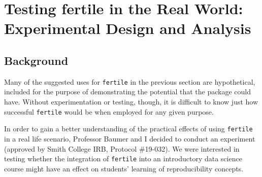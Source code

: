 \documentclass[12pt,twoside]{reedthesis}
\begin{document}
\hypertarget{testing-fertile-in-the-real-world-experimental-design-and-analysis}{%
\section{Testing fertile in the Real World: Experimental Design and Analysis}\label{testing-fertile-in-the-real-world-experimental-design-and-analysis}}

\hypertarget{background}{%
\subsection{Background}\label{background}}

Many of the suggested uses for \texttt{fertile} in the previous section are hypothetical, included for the purpose of demonstrating the potential that the package could have. Without experimentation or testing, though, it is difficult to know just how successful \texttt{fertile} would be when employed for any given purpose.

In order to gain a better understanding of the practical effects of using \texttt{fertile} in a real life scenario, Professor Baumer and I decided to conduct an experiment (approved by Smith College IRB, Protocol \#19-032). We were interested in testing whether the integration of \texttt{fertile} into an introductory data science course might have an effect on students' learning of reproducibility concepts.
\end{document}
